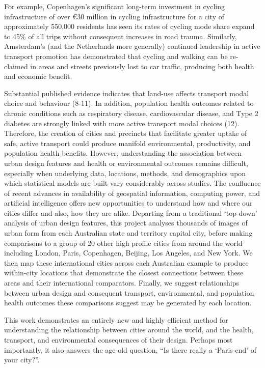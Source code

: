 \documentclass[final,3p,times,authoryear]{elsarticle}
\begin{document}
For example, Copenhagen’s significant long-term investment in cycling infrastructure of over €30 million in cycling infrastructure for a city of approximately 550,000 residents has seen its rates of cycling mode share expand to 45\% of all trips without consequent increases in road trauma. Similarly, Amsterdam’s (and the Netherlands more generally) continued leadership in active transport promotion has demonstrated that cycling and walking can be re-claimed in areas and streets previously lost to car traffic, producing both health and economic benefit.

Substantial published evidence indicates that land-use affects transport modal choice and behaviour  (8-11). In addition, population health outcomes related to chronic conditions such as respiratory disease, cardiovascular disease, and Type 2 diabetes are strongly linked with more active transport modal choices  (12). Therefore, the creation of cities and precincts that facilitate greater uptake of safe, active transport could produce manifold environmental, productivity, and population health benefits. However, understanding the association between urban design features and health or environmental outcomes remains difficult, especially when underlying data, locations, methods, and demographics upon which statistical models are built vary considerably across studies. 
The confluence of recent advances in availability of geospatial information, computing power, and artificial intelligence offers new opportunities to understand how and where our cities differ and also, how they are alike. Departing from a traditional ‘top-down’ analysis of urban design features, this project analyses thousands of images of urban form from each Australian state and territory capital city, before making comparisons to a group of 20 other high profile cities from around the world including London, Paris, Copenhagen, Beijing, Los Angeles, and New York. We then map these international cities across each Australian example to produce within-city locations that demonstrate the closest connections between these areas and their international comparators. Finally, we suggest relationships between urban design and consequent transport, environmental, and population health outcomes these comparisons suggest may be generated by each location.

This work demonstrates an entirely new and highly efficient method for understanding the relationship between cities around the world, and the health, transport, and environmental consequences of their design. Perhaps most importantly, it also answers the age-old question, “Is there really a ‘Paris-end’ of your city?”.
\end{document}
